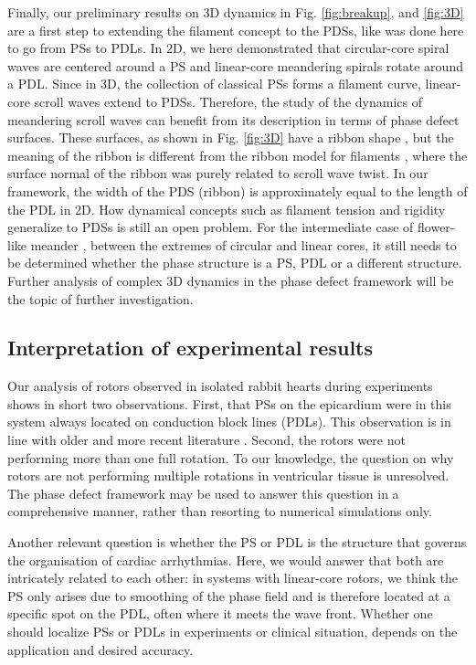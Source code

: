 \documentclass{article}
\begin{document}
Finally, our preliminary results on 3D dynamics in Fig. \ref{fig:breakup}, and \ref{fig:3D} are a first step to extending the filament concept to the PDSs, like was done here to go from PSs to  PDLs. In 2D, we here demonstrated that circular-core spiral waves are centered around a PS and linear-core meandering spirals rotate around a PDL. Since in 3D, the collection of classical PSs forms a filament curve, linear-core scroll waves extend to PDSs. Therefore, the study of the dynamics of meandering scroll waves can benefit from its description in terms of phase defect surfaces. These surfaces, as shown in Fig. \ref{fig:3D} have a ribbon shape \citep{Efimov:1999}, but the meaning of the ribbon is different from the ribbon model for filaments \citep{Echebarria:2006}, where the surface normal of the ribbon was purely related to scroll wave twist. In our framework, the width of the PDS (ribbon) is approximately equal to the length of the PDL in 2D. How dynamical concepts such as filament tension \citep{Biktashev:1994} and rigidity \citep{Dierckx:2012} generalize to PDSs is still an open problem. For the intermediate case of flower-like meander \citep{Barkley:1990b}, between the extremes of circular and linear cores, it still needs to be determined whether the phase structure  is a PS, PDL or a different structure. Further analysis of complex 3D dynamics in the phase defect framework will be the topic of further investigation.

\subsection{Interpretation of experimental results}

Our analysis of rotors observed in isolated rabbit hearts during experiments shows in short two observations. First, that PSs on the epicardium were in this system always located on conduction block lines (PDLs). This observation is in line with older and more recent literature \citep{Efimov:1999,Podziemski:2018}. Second, the rotors were not performing more than one full rotation. To our knowledge, the question on why rotors are not performing multiple rotations in ventricular tissue is unresolved. The phase defect framework may be used to answer this question in a comprehensive manner, rather than resorting to numerical simulations only. 

Another relevant question is whether the PS or PDL is the structure that governs the organisation of cardiac arrhythmias. Here, we would answer that both are intricately related to each other: in systems with linear-core rotors, we think the PS only arises due to smoothing of the phase field and is therefore located at a specific spot on the PDL, often where it meets the wave front. Whether one should localize PSs or PDLs in experiments or clinical situation, depends on the application and desired accuracy.
\end{document}
